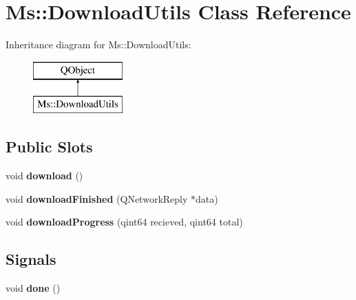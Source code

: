\hypertarget{class_ms_1_1_download_utils}{}\section{Ms\+:\+:Download\+Utils Class Reference}
\label{class_ms_1_1_download_utils}
Inheritance diagram for Ms\+:\+:Download\+Utils\+:\begin{figure}[H]
\begin{center}
\leavevmode
\includegraphics[height=2.000000cm]{class_ms_1_1_download_utils}
\end{center}
\end{figure}
\subsection*{Public Slots}
\begin{DoxyCompactItemize}
\item 
\mbox{\label{class_ms_1_1_download_utils_a2d24aa133f09ab4bd8a521f187b5ab04}} 
void {\bfseries download} ()
\item 
\mbox{\label{class_ms_1_1_download_utils_ad2a4e1bffd97913a6f8bd5e5d28cff44}} 
void {\bfseries download\+Finished} (Q\+Network\+Reply $\ast$data)
\item 
\mbox{\label{class_ms_1_1_download_utils_abbe6bafecfaf32dc755488178dd8c8f9}} 
void {\bfseries download\+Progress} (qint64 recieved, qint64 total)
\end{DoxyCompactItemize}
\subsection*{Signals}
\begin{DoxyCompactItemize}
\item 
\mbox{\label{class_ms_1_1_download_utils_ae8971af5b5ad3a965cf6ffe4a00ad48d}} 
void {\bfseries done} ()
\end{DoxyCompactItemize}
